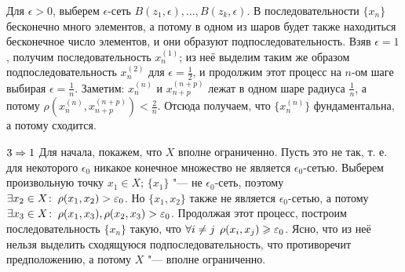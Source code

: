 \documentclass[main]{subfiles}
\begin{document}
\begin{itemproof}
  Для \( \epsilon > 0 \), выберем
  \( \epsilon \)-сеть \( B(z_1, \epsilon), \dots, B(z_k, \epsilon) \).
  В последовательности \( \{ x_n \} \) бесконечно много элементов,
  а потому в одном из шаров будет также находиться
  бесконечное число элементов, и они образуют подпоследовательность.
  Взяв \( \epsilon = 1 \), получим последовательность
  \( x_n^{(1)} \); из неё выделим таким же образом
  подпоследовательность \( x_n^{(2)} \) для \( \epsilon = \frac{1}{2} \),
  и продолжим этот процесс на \( n \)-ом шаге выбирая
  \( \epsilon = \frac{1}{n} \).
  Заметим: \( x_n^{(n)} \) и \( x_{n+p}^{(n+p)} \)
  лежат в одном шаре радиуса \( \frac{1}{n} \),
  а потому \( \rho(x_n^{(n)}, x_{n+p}^{(n+p)}) < \frac{2}{n} \).
  Отсюда получаем, что \( \{ x_n^{(n)} \} \) фундаментальна,
  а потому сходится.
\item[$3 \Rightarrow 1$]
  Для начала, покажем, что \( X \) вполне ограниченно.
  Пусть это не так, т. е. для некоторого \( \epsilon_0 \)
  никакое конечное множество не является \( \epsilon_0 \)-сетью.
  Выберем произвольную точку \( x_1 \in X \);
  \( \{ x_1 \} \) "--- не \( \epsilon_0 \)-сеть,
  поэтому \( \exists x_2 \in X \colon \: \rho(x_1, x_2) > \varepsilon_0 \).
  Но \( \{ x_1, x_2 \} \) также не является \( \epsilon_0 \)-сетью,
  а потому \( \exists x_3 \in X \colon \: \rho(x_1, x_3), \rho(x_2, x_3) > \varepsilon_0 \).
  Продолжая этот процесс, построим последовательность \( \{ x_n \} \)
  такую, что \( \forall {i \ne j} \; \, \rho(x_i, x_j) \geqslant \varepsilon_0 \).
  Ясно, что из неё нельзя выделить сходящуюся подпоследовательность,
  что противоречит предположению, а потому \( X \) "--- вполне ограниченно.


\end{itemproof}
\end{document}
